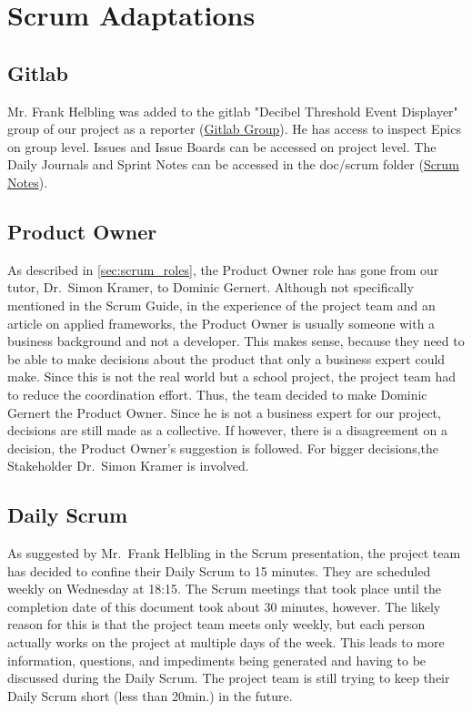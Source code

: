 \section{Scrum Adaptations}\label{sec:scrum-adaptations}
\subsection{Gitlab}
Mr. Frank Helbling was added to the gitlab "Decibel Threshold Event Displayer" group of our project as a reporter (\href{https://gitlab.ti.bfh.ch/decibel-threshold-event-displayer}{Gitlab Group}). He has access to inspect Epics on group level. Issues and Issue Boards can be accessed on project level. The Daily Journals and Sprint Notes can be accessed in the doc/scrum folder (\href{https://gitlab.ti.bfh.ch/decibel-threshold-event-displayer/decibel-threshold-event-displayer/-/tree/main/doc/scrum?ref_type=heads}{Scrum Notes}).
\subsection{Product Owner}\label{subsec:product-owner}
As described in \autoref{sec:scrum_roles}, the Product Owner role has gone from our tutor, Dr.\ Simon Kramer, to Dominic Gernert.
Although not specifically mentioned in the Scrum Guide\cite{scrum_guide}, in the experience
of the project team and an article on applied frameworks\cite{applied_frameworks_po}, the Product Owner is usually someone with a business background and not a developer.
This makes sense, because they need to be able to make decisions about the product that only a business expert could make.
Since this is not the real world but a school project, the project team had to reduce the coordination effort.
Thus, the team decided to make Dominic Gernert the Product Owner.
Since he is not a business expert for our project, decisions are still made as a collective.
If however, there is a disagreement on a decision, the Product Owner's suggestion is followed.
For bigger decisions,the Stakeholder Dr.\ Simon Kramer is involved.
\subsection{Daily Scrum}\label{subsec:daily-scrum}
As suggested by Mr.\ Frank Helbling in the Scrum presentation\cite{helbling_scrum3}, the project team has decided to confine their Daily Scrum to 15 minutes.
They are scheduled weekly on Wednesday at 18:15.
The Scrum meetings that took place until the completion date of this document took about 30 minutes, however.
The likely reason for this is that the project team meets only weekly,
but each person actually works on the project at multiple days of the week.
This leads to more information, questions, and impediments being generated and having to be discussed during the Daily Scrum.
The project team is still trying to keep their Daily Scrum short (less than 20min.) in the future.
